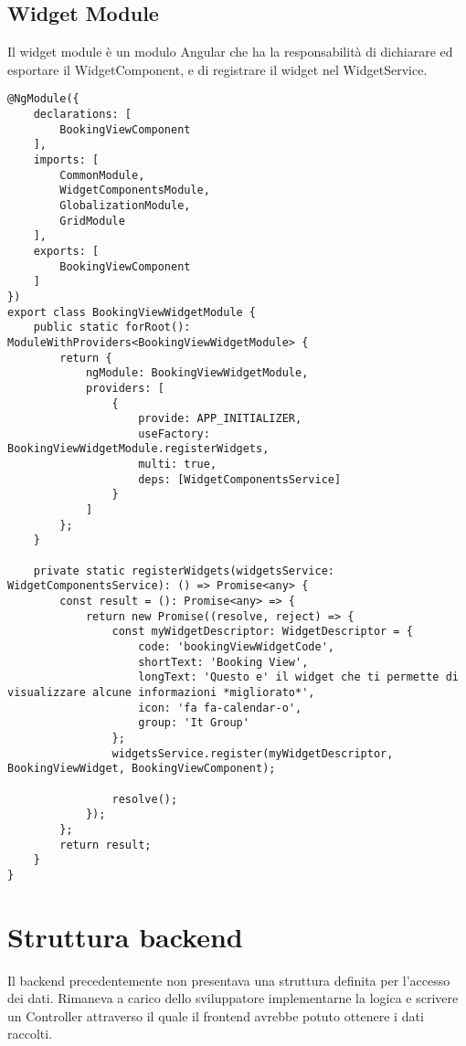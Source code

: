 \subsection{Widget Module}
Il widget module è un modulo Angular che ha la responsabilità di dichiarare ed esportare il WidgetComponent, e di registrare il widget nel WidgetService.
\begin{lstlisting}[caption={booking-view-widget.module.ts},label={booking_view_widget_module},style=javascriptCode]
@NgModule({
    declarations: [
        BookingViewComponent
    ],
    imports: [
        CommonModule,
        WidgetComponentsModule,
        GlobalizationModule,
        GridModule
    ],
    exports: [
        BookingViewComponent
    ]
})
export class BookingViewWidgetModule {
    public static forRoot(): ModuleWithProviders<BookingViewWidgetModule> {
        return {
            ngModule: BookingViewWidgetModule,
            providers: [
                {
                    provide: APP_INITIALIZER,
                    useFactory: BookingViewWidgetModule.registerWidgets,
                    multi: true,
                    deps: [WidgetComponentsService]
                }
            ]
        };
    }

    private static registerWidgets(widgetsService: WidgetComponentsService): () => Promise<any> {
        const result = (): Promise<any> => {
            return new Promise((resolve, reject) => {
                const myWidgetDescriptor: WidgetDescriptor = {
                    code: 'bookingViewWidgetCode',
                    shortText: 'Booking View',
                    longText: 'Questo e' il widget che ti permette di visualizzare alcune informazioni *migliorato*',
                    icon: 'fa fa-calendar-o',
                    group: 'It Group'
                };
                widgetsService.register(myWidgetDescriptor, BookingViewWidget, BookingViewComponent);

                resolve();
            });
        };
        return result;
    }
}
\end{lstlisting}

\section{Struttura backend}
Il backend precedentemente non presentava una struttura definita per l'accesso dei dati. Rimaneva a carico dello sviluppatore implementarne la logica e scrivere un Controller attraverso il quale il frontend avrebbe potuto ottenere i dati raccolti.

